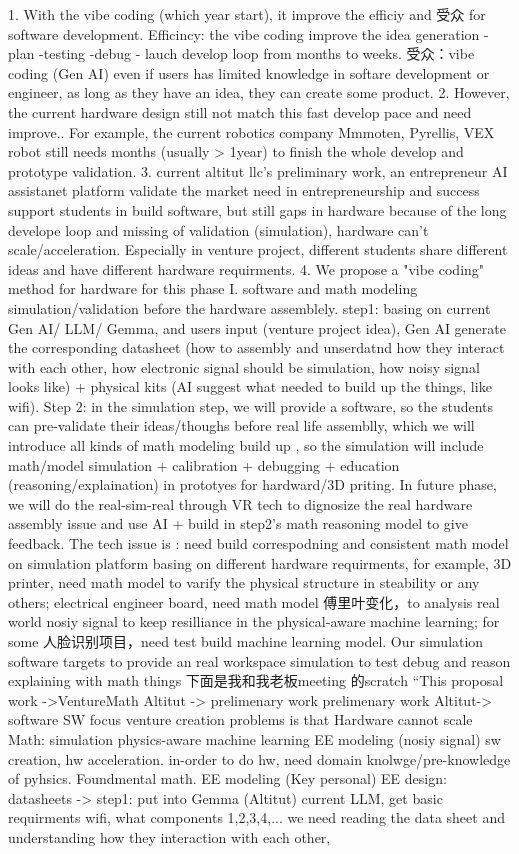 1. With the vibe coding (which year start), it improve the efficiy and 受众 for software development. Efficincy: the vibe coding improve the idea generation - plan -testing -debug - lauch develop loop from months to weeks. 受众：vibe coding (Gen AI) even if users has limited knowledge in softare development or engineer, as long as they have an idea, they can create some product. 2. However, the current hardware design still not match this fast develop pace and need improve.. For example, the current robotics company Mmmoten, Pyrellis, VEX robot still needs months (usually > 1year) to finish the whole develop and prototype validation. 3. current altitut llc's preliminary work, an entrepreneur AI assistanet platform validate the market need in entrepreneurship and success support students in build software, but still gaps in hardware because of the long develope loop and missing of validation (simulation), hardware can't scale/acceleration. Especially in venture project, different students share different ideas and have different hardware requirments. 4. We propose a "vibe coding" method for hardware for this phase I. software and math modeling simulation/validation before the hardware assemblely. step1: basing on current Gen AI/ LLM/ Gemma, and users input (venture project idea), Gen AI generate the corresponding datasheet (how to assembly and unserdatnd how they interact with each other, how electronic signal should be simulation, how noisy signal looks like) + physical kits (AI suggest what needed to build up the things, like wifi). Step 2: in the simulation step, we will provide a software, so the students can pre-validate their ideas/thoughs before real life assemblly, which we will introduce all kinds of math modeling build up , so the simulation will include math/model simulation + calibration + debugging + education (reasoning/explaination) in prototyes for hardward/3D priting. In future phase, we will do the real-sim-real through VR tech to dignosize the real hardware assembly issue and use AI + build in step2's math reasoning model to give feedback. The tech issue is : need build correspodning and consistent math model on simulation platform basing on different hardware requirments, for example, 3D printer, need math model to varify the physical structure in steability or any others; electrical engineer board, need math model 傅里叶变化，to analysis real world nosiy signal to keep resilliance in the physical-aware machine learning; for some 人脸识别项目，need test build machine learning model. Our simulation software targets to provide an real workspace simulation to test debug and reason explaining with math things 下面是我和我老板meeting 的scratch “This proposal work ->VentureMath Altitut -> prelimenary work prelimenary work Altitut-> software SW focus venture creation problems is that Hardware cannot scale Math: simulation physics-aware machine learning EE modeling (nosiy signal) sw creation, hw acceleration. in-order to do hw, need domain knolwge/pre-knowledge of pyhsics. Foundmental math. EE modeling (Key personal) EE design: datasheets -> step1: put into Gemma (Altitut) current LLM, get basic requirments wifi, what components 1,2,3,4,... we need reading the data sheet and understanding how they interaction with each other, 